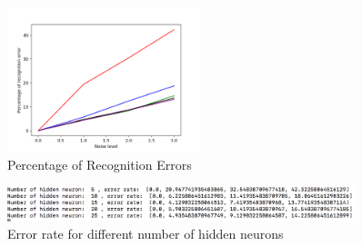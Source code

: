 \documentclass[11pt]{article}
\begin{document}
\begin{enumerate}
\begin{enumerate}
\begin{figure}[h!]
    \centering
     \includegraphics[height=0.5\textwidth, width=0.5\textwidth]{q2-a-1}
        \caption{Percentage of Recognition Errors}
\end{figure}
\begin{figure}[h!]
    \centering
     \includegraphics[width=0.9\textwidth]{q2-a-accuracy}
        \caption{Error rate for different number of hidden neurons}
\end{figure}


\end{enumerate}
\end{enumerate}
\end{document}
